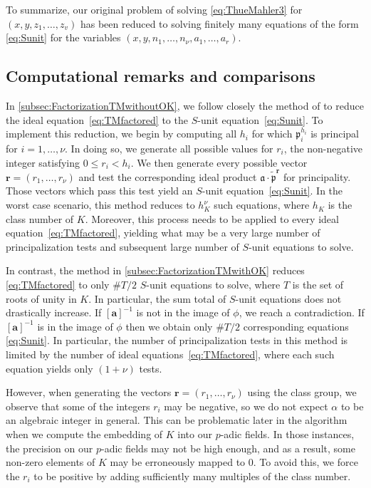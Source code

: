 To summarize, our original problem of solving \eqref{eq:ThueMahler3} for $(x,y,z_1,\dots, z_v)$ has been reduced to solving finitely many equations of the form \eqref{eq:Sunit} for the variables $(x,y, n_1, \dots, n_{\nu},a_1,\dots,a_r)$.


\subsection{Computational remarks and comparisons}
\label{subsec:FactorizationRemarks}

In \autoref{subsec:FactorizationTMwithoutOK}, we follow closely the method of \cite{TW3} to reduce the ideal equation~\eqref{eq:TMfactored} to the $S$-unit equation~\eqref{eq:Sunit}. To implement this reduction, we begin by computing all $h_i$ for which $\mathfrak{p}_i^{h_i}$ is principal for $i = 1, \dots, \nu$. In doing so, we generate all possible values for $r_i$, the non-negative integer satisfying $0 \leq r_i < h_i$. We then generate every possible vector $\mathbf{r} = (r_1, \dots, r_{\nu})$ and test the corresponding ideal product $\mathfrak{a} \cdot \tilde{\mathfrak{p}}^{\mathbf{r}}$ for principality. Those vectors which pass this test yield an $S$-unit equation~\eqref{eq:Sunit}. In the worst case scenario, this method reduces to $h_K^{\nu}$ such equations, where $h_K$ is the class number of $K$. Moreover, this process needs to be applied to every ideal equation~\eqref{eq:TMfactored}, yielding what may be a very large number of principalization tests and subsequent large number of $S$-unit equations to solve. 

In contrast, the method in \autoref{subsec:FactorizationTMwithOK} reduces \eqref{eq:TMfactored} to only $\#T/2$ $S$-unit equations to solve, where $T$ is the set of roots of unity in $K$. In particular, the sum total of $S$-unit equations does not drastically increase. If $[\mathbf{a}]^{-1}$ is not in the image of $\phi$, we reach a contradiction. If $[\mathbf{a}]^{-1}$ is in the image of $\phi$ then we obtain only $\#T/2$ corresponding equations \eqref{eq:Sunit}. In particular, the number of principalization tests in this method is limited by the number of ideal equations~\eqref{eq:TMfactored}, where each such equation yields only $(1+\nu)$ tests. 

However, when generating the vectors $\mathbf{r} = (r_1, \dots, r_{\nu})$ using the class group, we observe that some of the integers $r_i$ may be negative, so we do not expect $\alpha$ to be an algebraic integer in general. This can be problematic later in the algorithm when we compute the embedding of $K$ into our $p$-adic fields. In those instances, the precision on our $p$-adic fields may not be high enough, and as a result, some non-zero elements of $K$ may be erroneously mapped to $0$. To avoid this, we force the $r_i$ to be positive by adding sufficiently many multiples of the class number. 

